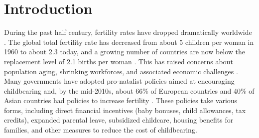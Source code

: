 \documentclass[a4paper,oneside,final,onecolumn,12pt,english]{article}
\begin{document}
\section{Introduction} \label{sec:intro}
\hspace{1.5cm} %
During the past half century, fertility rates have dropped dramatically worldwide \citep{goldin2025downside}. The global total fertility rate has decreased from about 5 children per woman in 1960 to about 2.3 today, and a growing number of countries are now below the replacement level of 2.1 births per woman \citep{rindfuss2010child, hart2024causal}. This has raised concerns about population aging, shrinking workforces, and associated economic challenges \citep{hart2024causal}. Many governments have adopted pro-natalist policies aimed at encouraging childbearing and, by the mid-2010s, about 66\% of European countries and 40\% of Asian countries had policies to increase fertility \citep{hart2024causal}. These policies take various forms, including direct financial incentives (baby bonuses, child allowances, tax credits), expanded parental leave, subsidized childcare, housing benefits for families, and other measures to reduce the cost of childbearing.

\end{document}
